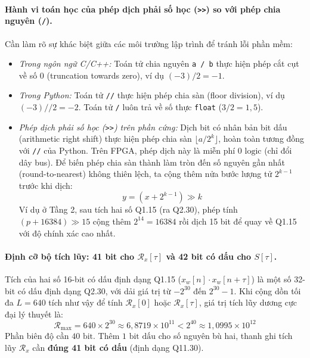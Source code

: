 \documentclass[11pt,a4paper]{article}
\begin{document}
\paragraph{Hành vi toán học của phép dịch phải số học (\texttt{>>}) so với phép chia nguyên (\texttt{/}).}
Cần làm rõ sự khác biệt giữa các môi trường lập trình để tránh lỗi phần mềm:
\begin{itemize}
    \setlength{\itemsep}{1pt}
    \item \emph{Trong ngôn ngữ C/C++:} Toán tử chia nguyên \texttt{a / b} thực hiện phép cắt cụt về số 0 (truncation towards zero), ví dụ $(-3) / 2 = -1$.
    \item \emph{Trong Python:} Toán tử \texttt{//} thực hiện phép chia sàn (floor division), ví dụ $(-3) // 2 = -2$. Toán tử \texttt{/} luôn trả về số thực \texttt{float} ($3 / 2 = 1{,}5$).
    \item \emph{Phép dịch phải số học (\texttt{>>}) trên phần cứng:} Dịch bit có nhân bản bit dấu (arithmetic right shift) thực hiện phép chia sàn $\lfloor a / 2^k \rfloor$, hoàn toàn tương đồng với \texttt{//} của Python. Trên FPGA, phép dịch này là miễn phí $0\text{ logic}$ (chỉ đổi dây bus). Để biến phép chia sàn thành làm tròn đến số nguyên gần nhất (round-to-nearest) không thiên lệch, ta cộng thêm nửa bước lượng tử $2^{k-1}$ trước khi dịch:
    \begin{equation}
    y = (x + 2^{k-1}) \gg k
    \label{eq:round_shift}
    \end{equation}
    Ví dụ ở Tầng 2, sau tích hai số Q1.15 (ra Q2.30), phép tính $(p + 16384) \gg 15$ cộng thêm $2^{14} = 16384$ rồi dịch 15 bit để quay về Q1.15 với độ chính xác cao nhất.
\end{itemize}

\paragraph{Định cỡ bộ tích lũy: 41 bit cho $\mathcal{R}_x[\tau]$ và 42 bit có dấu cho $S[\tau]$.}
Tích của hai số 16-bit có dấu định dạng Q1.15 ($x_w[n] \cdot x_w[n+\tau]$) là một số 32-bit có dấu định dạng Q2.30, với dải giá trị từ $-2^{30}$ đến $2^{30}-1$.
Khi cộng dồn tối đa $L = 640$ tích như vậy để tính $\mathcal{R}_x[0]$ hoặc $\mathcal{R}_x[\tau]$, giá trị tích lũy dương cực đại lý thuyết là:
\begin{equation}
\mathcal{R}_{\max} = 640 \times 2^{30} \approx 6{,}8719 \times 10^{11} < 2^{40} \approx 1{,}0995 \times 10^{12}
\end{equation}
Phần biên độ cần $40\text{ bit}$. Thêm $1\text{ bit dấu}$ cho số nguyên bù hai, thanh ghi tích lũy $\mathcal{R}_x$ cần \textbf{đúng 41 bit có dấu} (định dạng Q11.30).
\end{document}
